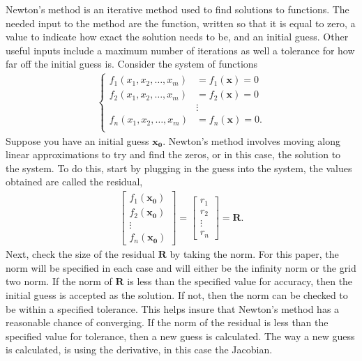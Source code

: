  Newton's method is an iterative method used to find solutions to functions. The needed input to the method are the function, written so that it is equal to zero, a value to indicate how exact the solution needs to be, and an initial guess. Other useful inputs include a maximum number of iterations as well a tolerance for how far off the initial guess is. Consider the system of functions
\begin{eqnarray}
 \begin{cases}
  f_1(x_1,x_2, \dots,x_m)&=f_1(\mathbf{x}) =0\\
  f_2(x_1,x_2, \dots,x_m)&=f_2(\mathbf{x}) =0\\
  &\vdots\\
  f_n(x_1,x_2, \dots,x_m)&=f_n(\mathbf{x}) =0.\\
 \end{cases}
\end{eqnarray}
Suppose you have an initial guess $\mathbf{x_0}$. Newton's method involves moving along linear approximations to try and find the zeros, or in this case, the solution to the system. To do this, start by plugging in the guess into the system, the values obtained are called the residual,
\begin{eqnarray}
 \begin{bmatrix}
 f_1(\mathbf{x_0})\\
 f_2(\mathbf{x_0})\\
 \vdots \\
 f_n(\mathbf{x_0})
 \end{bmatrix} 
 =
 \begin{bmatrix}
 r_1\\
 r_2 \\
 \vdots\\
 r_n
 \end{bmatrix}
 =\mathbf{R}.
\end{eqnarray}
Next, check the size of the residual $\mathbf{R}$ by taking the norm. For this paper, the norm will be specified in each case and will either be the infinity norm or the grid two norm. If the norm of $\mathbf{R}$ is less than the specified value for accuracy, then the initial guess is accepted as the solution. If not, then the norm can be checked to be within a specified tolerance. This helps insure that Newton's method has a reasonable chance of converging. If the norm of the residual is less than the specified value for tolerance, then a new guess is calculated. The way a new guess is calculated, is using the derivative, in this case the Jacobian. 


